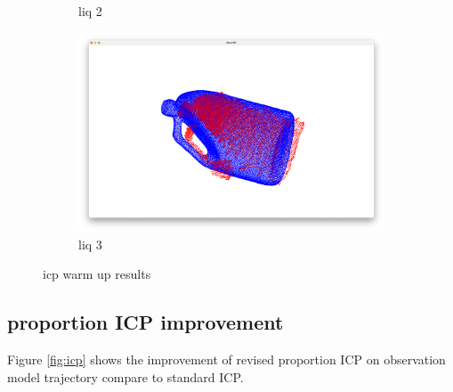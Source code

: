 \documentclass[conference]{IEEEtran}
\begin{document}
\begin{figure}
\begin{subfigure}{0.24\textwidth}
        \caption{liq 2}
        \label{fig:liq_2}
    \end{subfigure}
    \hfill
    \begin{subfigure}{0.24\textwidth}
        \includegraphics[width=\linewidth]{../code/icp_warm_up/liq_3.png}
        \caption{liq 3}
        \label{fig:liq_3}
    \end{subfigure}
    
    \caption{icp warm up results}
    \label{fig:icp_warm_up}
\end{figure}

\subsection{proportion ICP improvement}
Figure \ref*{fig:icp} shows the improvement of revised proportion ICP 
on observation model trajectory compare to standard ICP.
\end{document}
